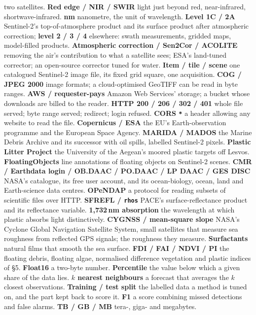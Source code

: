 \documentclass[10pt]{article}
\newcommand{\code}[1]{\texttt{#1}}
\begin{document}
two satellites. \textbf{Red edge / NIR / SWIR} light just beyond red, near-infrared, shortwave-infrared.
\textbf{nm} nanometre, the unit of wavelength. \textbf{Level 1C / 2A} Sentinel-2's top-of-atmosphere product and its
surface product after atmospheric correction; \textbf{level 2 / 3 / 4} elsewhere: swath measurements, gridded maps,
model-filled products. \textbf{Atmospheric correction / Sen2Cor / ACOLITE} removing the air's contribution to what a
satellite sees; ESA's land-tuned corrector; an open-source corrector tuned for water. \textbf{Item / tile / scene}
one catalogued Sentinel-2 image file, its fixed grid square, one acquisition. \textbf{COG / JPEG 2000}
image formats; a cloud-optimised GeoTIFF can be read in byte ranges. \textbf{AWS / requester-pays} Amazon Web Services'
storage; a bucket whose downloads are billed to the reader. \textbf{HTTP 200 / 206 / 302 / 401} whole file served;
byte range served; redirect; login refused. \textbf{CORS \code{*}} a header allowing any website to read the file.
\textbf{Copernicus / ESA} the EU's Earth-observation programme and the European Space Agency. \textbf{MARIDA /
MADOS} the Marine Debris Archive and its successor with oil spills, labelled Sentinel-2 pixels. \textbf{Plastic
Litter Project} the University of the Aegean's moored plastic targets off Lesvos. \textbf{FloatingObjects} line
annotations of floating objects on Sentinel-2 scenes. \textbf{CMR / Earthdata login / OB.DAAC / PO.DAAC / LP DAAC
/ GES DISC} NASA's catalogue, its free user account, and its ocean-biology, ocean, land and Earth-science data
centres. \textbf{OPeNDAP} a protocol for reading subsets of scientific files over HTTP. \textbf{SFREFL / \code{rhos}}
PACE's surface-reflectance product and its reflectance variable. \textbf{1,732\,nm absorption} the wavelength at
which plastic absorbs light distinctively. \textbf{CYGNSS / mean-square slope} NASA's Cyclone Global Navigation
Satellite System, small satellites that measure sea roughness from reflected GPS signals; the roughness they
measure. \textbf{Surfactants} natural films that smooth the sea surface. \textbf{FDI / FAI / NDVI / PI} the floating
debris, floating algae, normalised difference vegetation and plastic indices of \S5. \textbf{Float16} a two-byte
number. \textbf{Percentile} the value below which a given share of the data lies. \textbf{$k$ nearest neighbours}
a forecast that averages the $k$ closest observations. \textbf{Training / test split} the labelled data a method is
tuned on, and the part kept back to score it. \textbf{F1} a score combining missed detections and false alarms.
\textbf{TB / GB / MB} tera-, giga- and megabytes.
\normalsize
\end{document}
